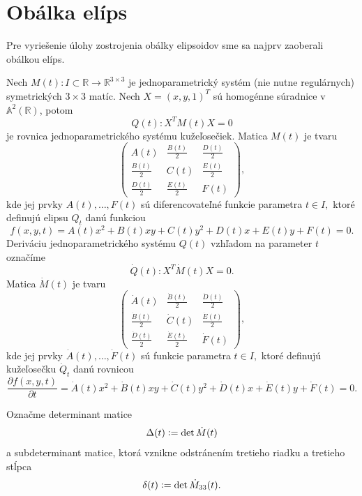 \section{Obálka elíps}
Pre vyriešenie úlohy zostrojenia obálky elipsoidov sme sa najprv zaoberali obálkou elíps.

Nech $M(t) \colon I \subset \mathbb{R} \rightarrow \mathbb{R}^{3 \times 3}$ je jednoparametrický systém (nie nutne regulárnych) symetrických $3 \times 3$ matíc. Nech $ X = (x, y, 1)^T$ sú homogénne súradnice v $\mathbb{A}^2(\mathbb{R})$, potom
\begin{equation*}
Q(t) \colon X^T M(t) X = 0 
\end{equation*}
je rovnica jednoparametrického systému kužeľosečiek. 
Matica $M(t)$ je tvaru
$$
\left(\begin{matrix} 
A(t) & \frac{B(t)}{2} & \frac{D(t)}{2} \\
\frac{B(t)}{2} & C(t) & \frac{E(t)}{2} \\
\frac{D(t)}{2} & \frac{E(t)}{2} & F(t) 
\end{matrix} \right),
$$
kde jej prvky $A(t), \dots, F(t)$ sú diferencovateľné funkcie parametra $t \in I,$ ktoré definujú elipsu $Q_t$ danú funkciou 
$$f(x, y, t) = A(t)x^2 + B(t)xy + C(t)y^2 + D(t)x + E(t)y + F(t) = 0.$$
Deriváciu jednoparametrického systému $Q(t)$ vzhľadom na parameter $t$ označíme
\begin{equation*}
\dot{Q}(t) \colon X^T \dot{M}(t) X = 0.
\end{equation*}
Matica $\dot{M}(t)$ je tvaru
$$
\left(\begin{matrix} 
\dot{A}(t) & \frac{\dot{B}(t)}{2} & \frac{\dot{D}(t)}{2} \\
\frac{\dot{B}(t)}{2} & \dot{C}(t) & \frac{\dot{E}(t)}{2} \\
\frac{\dot{D}(t)}{2} & \frac{\dot{E}(t)}{2} & \dot{F}(t) 
\end{matrix} \right),
$$
kde jej prvky $\dot{A}(t), \dots, \dot{F}(t)$ sú funkcie parametra $t \in I,$ ktoré definujú kužeľosečku $\dot{Q}_t$ danú rovnicou 
$$\dfrac{\partial f(x, y, t)}{\partial t} = \dot{A}(t)x^2 + \dot{B}(t)xy + \dot{C}(t)y^2 + \dot{D}(t)x + \dot{E}(t)y + \dot{F}(t) = 0.$$

Označme determinant matice 
$$\Delta(t) \vcentcolon = \det \dot{M}(t) $$
a subdeterminant matice, ktorá vznikne odstránením tretieho riadku a tretieho stĺpca 
$$\delta(t) \vcentcolon = \det \dot{M}_{33}(t).$$ 

